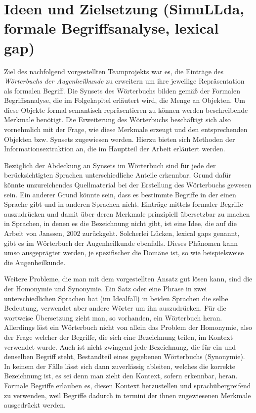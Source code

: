 \documentclass[pagesize,DIV=calc,12pt,draft]{scrreprt}
\begin{document}
\section{Ideen und Zielsetzung (SimuLLda, formale Begriffsanalyse,
lexical gap)}

Ziel des nachfolgend vorgestellten Teamprojekts war es, die Einträge des
\emph{Wörterbuchs der Augenheilkunde} zu erweitern um ihre jeweilige
Repräsentation als formalen Begriff. Die Synsets des Wörterbuchs bilden
gemäß der Formalen Begriffsanalyse, die im Folgekapitel erläutert wird,
die Menge an Objekten. Um diese Objekte formal semantisch repräsentieren
zu können werden beschreibende Merkmale benötigt. Die Erweiterung des
Wörterbuchs beschäftigt sich also vornehmlich mit der Frage, wie diese
Merkmale erzeugt und den entsprechenden Objekten bzw. Synsets zugewiesen
werden. Hierzu bieten sich Methoden der Informationsextraktion an, die
im Hauptteil der Arbeit erläutert werden.

Bezüglich der Abdeckung an Synsets im Wörterbuch sind für jede der
berücksichtigten Sprachen unterschiedliche Anteile erkennbar. Grund
dafür könnte unzureichendes Quellmaterial bei der Erstellung des
Wörterbuchs gewesen sein. Ein anderer Grund könnte sein, dass es
bestimmte Begriffe in der einen Sprache gibt und in anderen Sprachen
nicht. Einträge mittels formaler Begriffe auszudrücken und damit über
deren Merkmale prinzipiell übersetzbar zu machen in Sprachen, in denen
es die Bezeichnung nicht gibt, ist eine Idee, die auf die Arbeit von
Janssen, 2002 zurückgeht. Solcherlei Lücken, lexical gaps genannt, gibt
es im Wörterbuch der Augenheilkunde ebenfalls. Dieses Phänomen kann umso
ausgeprägter werden, je spezifischer die Domäne ist, so wie
beispielsweise die Augenheilkunde.

Weitere Probleme, die man mit dem vorgestellten Ansatz gut lösen kann,
sind die der Homonymie und Synonymie. Ein Satz oder eine Phrase in zwei
unterschiedlichen Sprachen hat (im Idealfall) in beiden Sprachen die
selbe Bedeutung, verwendet aber andere Wörter um ihn auszudrücken. Für
die wortweise Übersetzung zieht man, so vorhanden, ein Wörterbuch heran.
Allerdings löst ein Wörterbuch nicht von allein das Problem der
Homonymie, also der Frage welcher der Begriffe, die sich eine
Bezeichnung teilen, im Kontext verwendet wurde. Auch ist nicht zwingend
jede Bezeichnung, die für ein und denselben Begriff steht, Bestandteil
eines gegebenen Wörterbuchs (Synonymie). In keinem der Fälle lässt sich
dann zuverlässig ableiten, welches die korrekte Bezeichnung ist, es sei
denn man zieht den Kontext, sofern erkennbar, heran. Formale Begriffe
erlauben es, diesen Kontext herzustellen und sprachübergreifend zu
verwenden, weil Begriffe dadurch in termini der ihnen zugewiesenen
Merkmale ausgedrückt werden.
\end{document}
